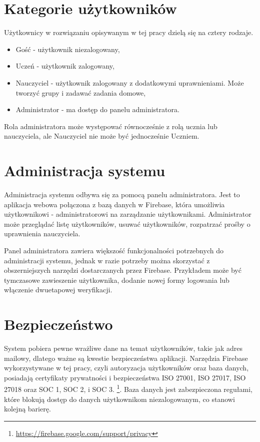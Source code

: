 \documentclass[a4paper,twoside,12pt]{book}
\begin{document}
\section{Kategorie użytkowników}

Użytkownicy w rozwiązaniu opisywanym w tej pracy dzielą się na cztery rodzaje. 
\begin{itemize}
\item Gość - użytkownik niezalogowany,
\item Uczeń - użytkownik zalogowany,
\item Nauczyciel - użytkownik zalogowany z dodatkowymi uprawnieniami. Może tworzyć grupy i zadawać zadania domowe,
\item Administrator - ma dostęp do panelu administratora.
\end{itemize}
Rola administratora może występować równocześnie z rolą ucznia lub nauczyciela, ale Nauczyciel nie może być jednocześnie Uczniem.


\section{Administracja systemu}

Administracja systemu odbywa się za pomocą panelu administratora. Jest to aplikacja webowa połączona z bazą danych w Firebase, która umożliwia użytkownikowi - administratorowi na zarządzanie użytkownikami. Administrator może przeglądać listę użytkowników, usuwać użytkowników, rozpatrzać prośby o uprawnienia nauczyciela. 

Panel administratora zawiera większość funkcjonalności potrzebnych do administracji systemu, jednak w razie potrzeby można skorzystać z obszerniejszych narzędzi dostarczanych przez Firebase. Przykładem może być tymczasowe zawieszenie użytkownika, dodanie nowej formy logowania lub włączenie dwuetapowej weryfikacji.

\section{Bezpieczeństwo}

System pobiera pewne wrażliwe dane na temat użytkowników, takie jak adres mailowy, dlatego ważne są kwestie bezpieczeństwa aplikacji. Narzędzia Firebase wykorzystywane w tej pracy, czyli autoryzacja użytkowników oraz baza danych, posiadają certyfikaty prywatności i bezpieczeństwa ISO 27001, ISO 27017, ISO 27018 oraz SOC 1, SOC 2, i SOC 3. \footnote{\url{https://firebase.google.com/support/privacy}}. 
Baza danych jest zabezpieczona regułami, które blokują dostęp do danych użytkownikom niezalogowanym, co stanowi kolejną barierę.
\end{document}
